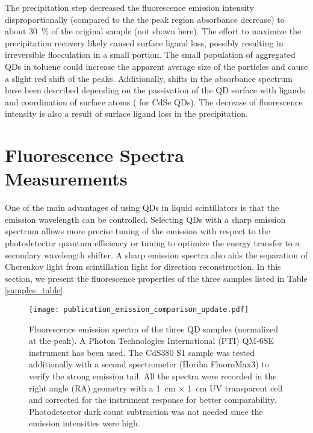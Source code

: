 \documentclass[cits]{JINST}
\begin{document}
The precipitation step decreased the fluorescence emission intensity disproportionally (compared to the the peak region absorbance decrease) to about 30~\% of the original sample (not shown here). The effort to maximize the precipitation recovery likely caused surface ligand loss, possibly resulting in irreversible flocculation in a small portion. The small population of aggregated QDs in toluene could increase the apparent average size of the particles and cause a slight red shift of the peaks. Additionally, shifts in the absorbance spectrum have been described depending on the passivation of the QD surface with ligands and coordination of surface atoms (\cite{inerbaev} for CdSe QDs). The decrease of fluorescence intensity is also a result of surface ligand loss in the precipitation. 

\section{Fluorescence Spectra Measurements}\label{Fluorescence_section}
One of the main advantages of using QDs in liquid scintillators is that the emission wavelength can be controlled. Selecting QDs with a sharp emission spectrum allows more precise tuning of the emission with respect to the photodetector quantum efficiency or tuning to optimize the energy transfer to a secondary wavelength shifter. A sharp emission spectra also aids the separation of Cherenkov light from scintillation light for direction reconstruction. In this section, we present the fluorescence properties of the three samples listed in Table \ref{samples_table}. 

\begin{figure}
      \begin{center}
        \texttt{[image: publication\_emission\_comparison\_update.pdf]}
        \caption[]{Fluorescence emission spectra of the three QD samples (normalized at the peak). A Photon Technologies International (PTI) QM-6SE instrument has been used. The CdS380 S1 sample was tested additionally with a second spectrometer (Horiba FluoroMax3) to verify the strong emission tail. All the spectra were recorded in the right angle (RA) geometry with a 1~cm $\times$ 1~cm UV transparent cell and corrected for the instrument response for better comparability. Photodetector dark count subtraction was not needed since the emission intensities were high. \label{emission_comp}}
        \end{center}
\end{figure}
\end{document}
